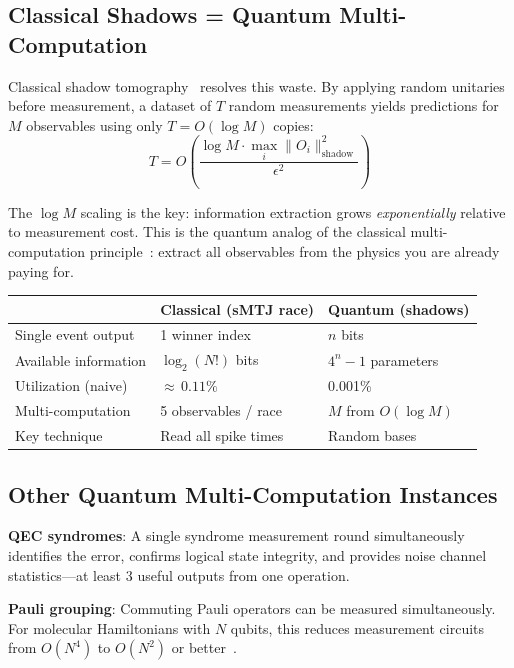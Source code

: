 \documentclass[11pt]{article}
\begin{document}
\subsection{Classical Shadows = Quantum Multi-Computation}

Classical shadow tomography~\cite{shadows} resolves this waste. By applying random unitaries before measurement, a dataset of $T$ random measurements yields predictions for $M$ observables using only $T = O(\log M)$ copies:
\begin{equation}
T = O\!\left(\frac{\log M \cdot \max_i \|O_i\|^2_{\text{shadow}}}{\epsilon^2}\right)
\end{equation}

The $\log M$ scaling is the key: information extraction grows \textit{exponentially} relative to measurement cost. This is the quantum analog of the classical multi-computation principle~\cite{bieg_multi}: extract all observables from the physics you are already paying for.

\begin{center}
\begin{tabular}{lll}
\toprule
& Classical (sMTJ race) & Quantum (shadows) \\
\midrule
Single event output & 1 winner index & $n$ bits \\
Available information & $\log_2(N!)$ bits & $4^n - 1$ parameters \\
Utilization (naive) & ${\approx}\,0.11\%$ & 0.001\% \\
Multi-computation & 5 observables / race & $M$ from $O(\log M)$ \\
Key technique & Read all spike times & Random bases \\
\bottomrule
\end{tabular}
\end{center}

\subsection{Other Quantum Multi-Computation Instances}

\textbf{QEC syndromes}: A single syndrome measurement round simultaneously identifies the error, confirms logical state integrity, and provides noise channel statistics---at least 3 useful outputs from one operation.

\textbf{Pauli grouping}: Commuting Pauli operators can be measured simultaneously. For molecular Hamiltonians with $N$ qubits, this reduces measurement circuits from $O(N^4)$ to $O(N^2)$ or better~\cite{pauli_grouping}.
\end{document}
